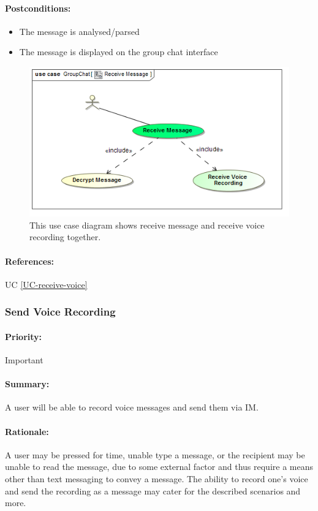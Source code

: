 \documentclass[11pt]{article}
\begin{document}
\paragraph{{Postconditions:}}
\begin{itemize}
\item The message is analysed/parsed
\item The message is displayed on the group chat interface
\end{itemize}
\begin{figure}[H]
\centering
\includegraphics[width=5in]{./images/UC_Receive_Message.png}
\caption[Receive Message Use Case Diagram]{This use case diagram shows receive message and receive voice recording together.}
\label{FR-figure-create-group}
\end{figure}
\paragraph{References:} UC \ref{UC-receive-voice}

\subsubsection{Send Voice Recording} \label{UC-send-voice}
\paragraph{Priority:} Important
\paragraph{Summary:} A user will be able to record voice messages and send them via IM.
\paragraph{Rationale:} A user may be pressed for time, unable type a message, or the recipient may be unable to read the message, due to some external factor and thus require a means other than text messaging to convey a message. The ability to record one's voice and send the recording as a message may cater for the described scenarios and more.
\end{document}
